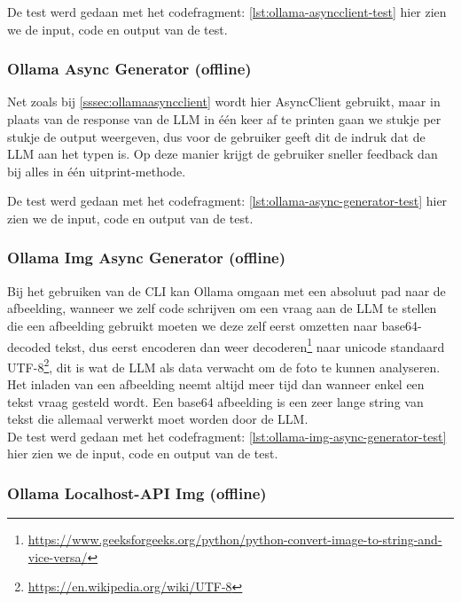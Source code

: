 De test werd gedaan met het codefragment: \ref{lst:ollama-asyncclient-test} hier zien we de input, code en output van de test.

\subsubsection{Ollama Async Generator (offline)}
\label{sssec:ollamaasyncgenerator}

Net zoals bij \ref{sssec:ollamaasyncclient} wordt hier AsyncClient gebruikt, maar in plaats van de response van de LLM in één keer af te printen gaan we stukje per stukje de output weergeven, dus voor de gebruiker geeft dit de indruk dat de LLM aan het typen is. Op deze manier krijgt de gebruiker sneller feedback dan bij alles in één uitprint-methode.

De test werd gedaan met het codefragment: \ref{lst:ollama-async-generator-test} hier zien we de input, code en output van de test.

\subsubsection{Ollama Img Async Generator (offline)}
\label{sssec:ollamaimgasyncgenerator}

Bij het gebruiken van de CLI kan Ollama omgaan met een absoluut pad naar de afbeelding, wanneer we zelf code schrijven om een vraag aan de LLM te stellen die een afbeelding gebruikt moeten we deze zelf eerst omzetten naar base64-decoded tekst, dus eerst encoderen dan weer decoderen\footnote{\href{https://www.geeksforgeeks.org/python/python-convert-image-to-string-and-vice-versa/}{https://www.geeksforgeeks.org/python/python-convert-image-to-string-and-vice-versa/}} naar unicode standaard UTF-8\footnote{\href{https://en.wikipedia.org/wiki/UTF-8}{https://en.wikipedia.org/wiki/UTF-8}}, dit is wat de LLM als data verwacht om de foto te kunnen analyseren. \\

Het inladen van een afbeelding neemt altijd meer tijd dan wanneer enkel een tekst vraag gesteld wordt. Een base64 afbeelding is een zeer lange string van tekst die allemaal verwerkt moet worden door de LLM. \\ %

De test werd gedaan met het codefragment: \ref{lst:ollama-img-async-generator-test} hier zien we de input, code en output van de test.

\subsubsection{Ollama Localhost-API Img (offline)}
\label{sssec:ollamalocalhostapi}

